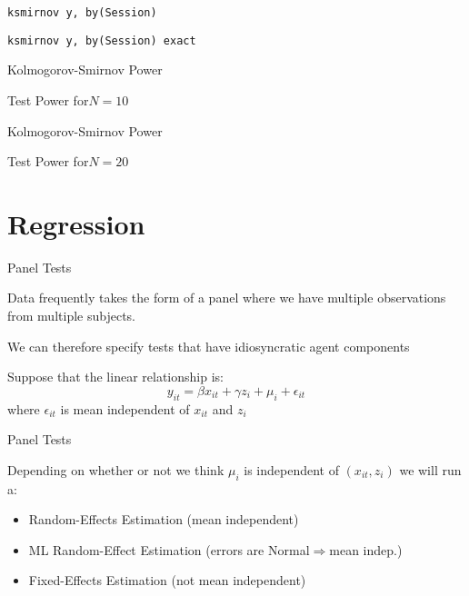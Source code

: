 \documentclass{beamer}
\begin{document}
\begin{frame}
    \begin{card}[STATA]
        \texttt{ksmirnov y, by(Session)}
        
        \texttt{ksmirnov y, by(Session) exact }
    \end{card}
\end{frame}

\begin{frame}{Kolmogorov-Smirnov Power}
\begin{center}\end{center}

 \begin{card}Test Power for$N=10$\end{card}
\end{frame}

\begin{frame}{Kolmogorov-Smirnov Power}
\begin{center}\end{center}

\begin{card}Test Power for$N=20$\end{card}
\end{frame}

\section{Regression}
\begin{frame}{Panel Tests}
	\begin{card}
	 Data frequently takes the form of a panel where we have multiple observations from multiple subjects.
	 
	We can therefore specify tests that have idiosyncratic agent components
	\end{card}
		\pause
	\begin{card} Suppose that the linear relationship is:
			$$ y_{it}=\beta x_{it} +\gamma z_i+\mu_i+\epsilon_{it} $$
		where $\epsilon_{it}$ is mean independent of $x_{it}$ and $z_i$ \end{card}
\end{frame}

\begin{frame}{Panel Tests}
\begin{card}
 Depending on whether or not we think $\mu_i$ is independent of $(x_{it},z_i)$ we will run a:
		\begin{itemize}
			\item Random-Effects Estimation (mean independent) 
			
			\item ML Random-Effect Estimation (errors are Normal$\Rightarrow$mean indep.)
			
			\item Fixed-Effects Estimation (not mean independent)
		\end{itemize}
	\end{card}
\end{frame}
\end{document}
